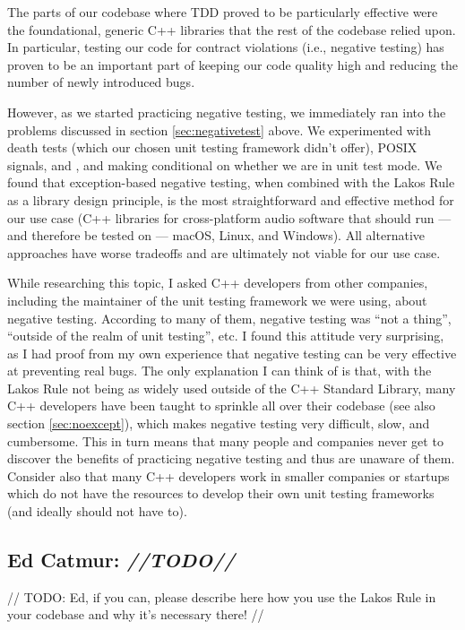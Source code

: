 The parts of our codebase where TDD proved to be particularly effective were the foundational, generic C++ libraries that the rest of the codebase relied upon. In particular, testing our code for contract violations (i.e., negative testing) has proven to be an important part of keeping our code quality high and reducing the number of newly introduced bugs. 

However, as we started practicing negative testing, we immediately ran into the problems discussed in section \ref{sec:negativetest} above. We experimented with death tests (which our chosen unit testing framework didn't offer), POSIX signals,  and , and making  conditional on whether we are in unit test mode. We found that exception-based negative testing, when combined with the Lakos Rule as a library design principle, is the most straightforward and effective method for our use case (C++ libraries for cross-platform audio software that should run --- and therefore be tested on --- macOS, Linux, and Windows). All alternative approaches have worse tradeoffs and are ultimately not viable for our use case.

While researching this topic, I asked C++ developers from other companies, including the maintainer of the unit testing framework we were using, about negative testing. According to many of them, negative testing was ``not a thing'', ``outside of the realm of unit testing'', etc. I found this attitude very surprising, as I had proof from my own experience that negative testing can be very effective at preventing real bugs. The only explanation I can think of is that, with the Lakos Rule not being as widely used outside of the C++ Standard Library, many C++ developers have been taught to sprinkle  all over their codebase (see also section \ref{sec:noexcept}), which makes negative testing very difficult, slow, and cumbersome. This in turn means that many people and companies never get to discover the benefits of practicing negative testing and thus are unaware of them. Consider also that many C++ developers work in smaller companies or startups which do not have the resources to develop their own unit testing frameworks (and ideally should not have to).

\subsection{Ed Catmur: \emph{//TODO//}}

// TODO: Ed, if you can, please describe here how you use the Lakos Rule in your codebase and why it's necessary there! //

